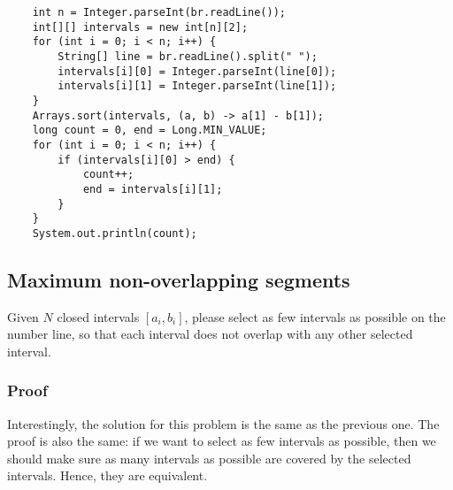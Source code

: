 \documentclass{article}
\begin{document}
\begin{verbatim}
    int n = Integer.parseInt(br.readLine());
    int[][] intervals = new int[n][2];
    for (int i = 0; i < n; i++) {
        String[] line = br.readLine().split(" ");
        intervals[i][0] = Integer.parseInt(line[0]);
        intervals[i][1] = Integer.parseInt(line[1]);
    }
    Arrays.sort(intervals, (a, b) -> a[1] - b[1]);
    long count = 0, end = Long.MIN_VALUE;
    for (int i = 0; i < n; i++) {
        if (intervals[i][0] > end) {
            count++;
            end = intervals[i][1];
        }
    }
    System.out.println(count);
\end{verbatim}

\subsection{Maximum non-overlapping segments}

Given $N$ closed intervals $[a_i,b_i]$, please select as few intervals as possible on the number line, so that each interval does not overlap with any other selected interval.

\subsubsection{Proof}


Interestingly, the solution for this problem is the same as the previous one. The proof is also the same: if we want to select as few intervals as possible, then we should make sure as many intervals as possible are covered by the selected intervals. Hence, they are equivalent.
\end{document}
